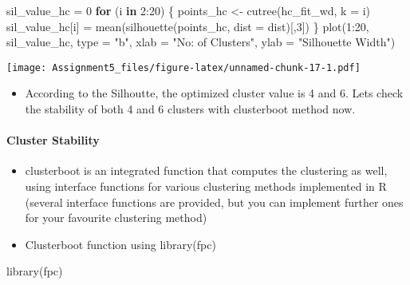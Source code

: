 \documentclass[
]{article}
\newenvironment{Shaded}{\begin{snugshade}}{\end{snugshade}}
\newcommand{\AttributeTok}[1]{\textcolor[rgb]{0.77,0.63,0.00}{#1}}
\newcommand{\ControlFlowTok}[1]{\textcolor[rgb]{0.13,0.29,0.53}{\textbf{#1}}}
\newcommand{\DecValTok}[1]{\textcolor[rgb]{0.00,0.00,0.81}{#1}}
\newcommand{\FunctionTok}[1]{\textcolor[rgb]{0.00,0.00,0.00}{#1}}
\newcommand{\NormalTok}[1]{#1}
\newcommand{\OtherTok}[1]{\textcolor[rgb]{0.56,0.35,0.01}{#1}}
\newcommand{\SpecialCharTok}[1]{\textcolor[rgb]{0.00,0.00,0.00}{#1}}
\newcommand{\StringTok}[1]{\textcolor[rgb]{0.31,0.60,0.02}{#1}}
\providecommand{\tightlist}{%
  \setlength{\itemsep}{0pt}\setlength{\parskip}{0pt}}
\begin{document}
\begin{Shaded}
\begin{Highlighting}[]
\NormalTok{sil\_value\_hc }\OtherTok{=} \DecValTok{0}
\ControlFlowTok{for}\NormalTok{ (i }\ControlFlowTok{in} \DecValTok{2}\SpecialCharTok{:}\DecValTok{20}\NormalTok{) \{}
\NormalTok{  points\_hc }\OtherTok{\textless{}{-}} \FunctionTok{cutree}\NormalTok{(hc\_fit\_wd, }\AttributeTok{k =}\NormalTok{ i)}
\NormalTok{  sil\_value\_hc[i] }\OtherTok{=} \FunctionTok{mean}\NormalTok{(}\FunctionTok{silhouette}\NormalTok{(points\_hc, }\AttributeTok{dist =}\NormalTok{ dist)[,}\DecValTok{3}\NormalTok{])}
\NormalTok{\}}
\FunctionTok{plot}\NormalTok{(}\DecValTok{1}\SpecialCharTok{:}\DecValTok{20}\NormalTok{, sil\_value\_hc, }\AttributeTok{type =} \StringTok{"b"}\NormalTok{, }\AttributeTok{xlab =} \StringTok{"No: of Clusters"}\NormalTok{, }\AttributeTok{ylab =} \StringTok{"Silhouette Width"}\NormalTok{)}
\end{Highlighting}
\end{Shaded}

\texttt{[image: Assignment5\_files/figure-latex/unnamed-chunk-17-1.pdf]}

\begin{itemize}
\tightlist
\item
  According to the Silhoutte, the optimized cluster value is 4 and 6.
  Lets check the stability of both 4 and 6 clusters with clusterboot
  method now.
\end{itemize}

\hypertarget{cluster-stability}{%
\paragraph{Cluster Stability}\label{cluster-stability}}

\begin{itemize}
\item
  clusterboot is an integrated function that computes the clustering as
  well, using interface functions for various clustering methods
  implemented in R (several interface functions are provided, but you
  can implement further ones for your favourite clustering method)
\item
  Clusterboot function using library(fpc)
\end{itemize}

\begin{Shaded}
\begin{Highlighting}[]
\FunctionTok{library}\NormalTok{(fpc)}
\end{Highlighting}
\end{Shaded}
\end{document}
